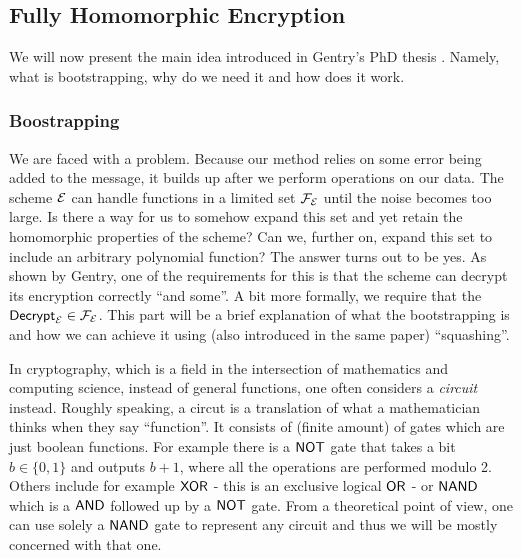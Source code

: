 \subsection{Fully Homomorphic Encryption}
We will now present the main idea introduced in Gentry's PhD thesis \cite{gentry_phd}. Namely, what is bootstrapping, why do we need it and how does it work. %

\subsubsection{Boostrapping}
We are faced with a problem. Because our method relies on some error being added to the message, it builds up after we perform operations on our data. The scheme $\mathcal{E}$ can handle functions in a limited set $\mathcal{F}_{\mathcal{E}}$ until the noise becomes too large. Is there a way for us to somehow expand this set and yet retain the homomorphic properties of the scheme? Can we, further on, expand this set to include an arbitrary polynomial function? The answer turns out to be yes. As shown by Gentry, one of the requirements for this is that the scheme can decrypt its encryption correctly ``and some''. A bit more formally, we require that the $\textsf{Decrypt}_{\mathcal{E}} \in \mathcal{F}_{\mathcal{E}}$. This part will be a brief explanation of what the bootstrapping is and how we can achieve it using (also introduced in the same paper) ``squashing''.

\begin{remark}
  In cryptography, which is a field in the intersection of mathematics and computing science, instead of general functions, one often considers a \textit{circuit} instead. Roughly speaking, a circut is a translation of what a mathematician thinks when they say ``function''. It consists of (finite amount) of gates which are just boolean functions. For example there is a $\textsf{NOT}$ gate that takes a bit $b \in \{0,1\}$ and outputs $b + 1$, where all the operations are performed modulo 2. Others include for example $\textsf{XOR}$ - this is an exclusive logical $\textsf{OR}$ - or $\textsf{NAND}$ which is a $\textsf{AND}$ followed up by a $\textsf{NOT}$ gate. From a theoretical point of view, one can use solely a $\textsf{NAND}$ gate to represent any circuit and thus we will be mostly concerned with that one.
\end{remark}

